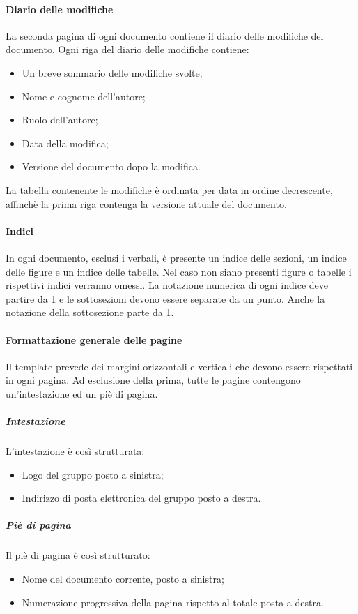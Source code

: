 \paragraph{Diario delle modifiche} \Spazio
\label{registroModifiche}
La seconda pagina di ogni documento contiene il diario delle modifiche del documento.
Ogni riga del diario delle modifiche contiene:
\begin{itemize}
	\item Un breve sommario delle modifiche svolte;
	\item Nome e cognome dell’autore;
	\item Ruolo dell’autore;
	\item Data della modifica;
	\item Versione del documento dopo la modifica.
\end{itemize}
La tabella contenente le modifiche è ordinata per data in ordine decrescente, affinchè la prima riga contenga la versione attuale del documento.

\paragraph{Indici} \Spazio
In ogni documento, esclusi i verbali, è presente un indice delle sezioni, un indice delle figure e un indice delle tabelle. Nel caso non siano presenti figure o tabelle i rispettivi indici verranno omessi. La notazione numerica di ogni indice deve partire da 1 e le sottosezioni devono essere separate da un punto. Anche la notazione della sottosezione parte da 1.

\paragraph{Formattazione generale delle pagine} \Spazio
Il template prevede dei margini orizzontali e verticali che devono essere rispettati in ogni pagina. Ad esclusione della prima, tutte le pagine contengono un’intestazione ed un piè di pagina.

\subparagraph{Intestazione} \Spazio
L’intestazione è così strutturata:
\begin{itemize}
	\item Logo del gruppo posto a sinistra;
	\item Indirizzo di posta elettronica del gruppo posto a destra.
\end{itemize}

\subparagraph{Piè di pagina} \Spazio
Il piè di pagina è così strutturato:
\begin{itemize}
	\item Nome del documento corrente, posto a sinistra;
	\item Numerazione progressiva della pagina rispetto al totale posta a destra.
\end{itemize}

